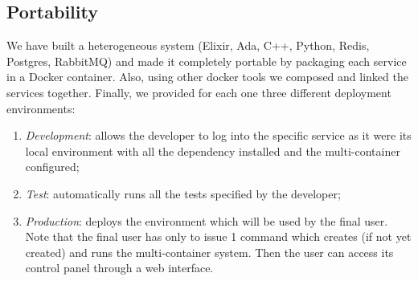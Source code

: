 \subsection{Portability}
We have built a heterogeneous system
(Elixir, Ada, C++, Python, Redis, Postgres, RabbitMQ)
and made it completely portable by packaging each service in a Docker container.
Also, using other docker tools we composed and linked the services together.
Finally, we provided for each one three different deployment environments:
\begin{enumerate}
  \item \textit{Development}: allows the developer to
  log into the specific service as it were its local environment
  with all the dependency installed and the multi-container configured;
  \item \textit{Test}: automatically runs all the tests specified by
  the developer;
  \item \textit{Production}: deploys the environment which will be used by
  the final user. Note that the final user has only to issue 1 command which
  creates (if not yet created) and runs the multi-container system.
  Then the user can access its control panel through a web interface.
\end{enumerate}